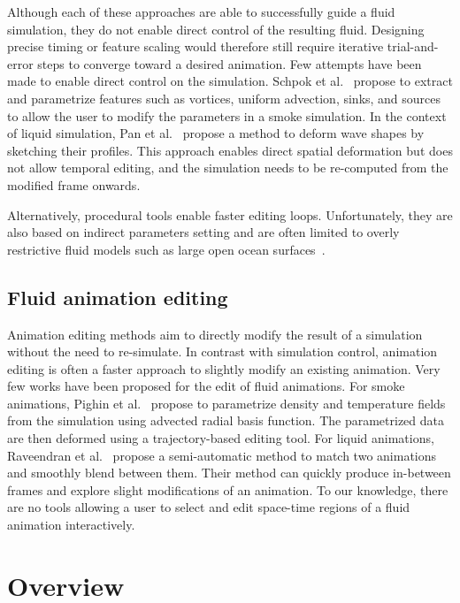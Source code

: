 \documentclass[review]{acmsiggraph}
\begin{document}
Although each of these approaches are able to successfully guide a fluid simulation, they do not enable direct control of the resulting fluid. 
Designing precise timing or feature scaling would therefore still require iterative trial-and-error steps to converge toward a desired animation.
Few attempts have been made to enable direct control on the simulation. 
Schpok et al.~ propose to extract and parametrize features such as vortices, uniform advection, sinks, and sources to allow the user to modify the parameters in a smoke simulation. 
In the context of liquid simulation, Pan et al.~ propose a method to deform wave shapes by sketching their profiles. 
This approach enables direct spatial deformation but does not allow temporal editing, and the simulation needs to be re-computed from the modified frame onwards.

Alternatively, procedural tools enable faster editing loops. 
Unfortunately, they are also based on indirect parameters setting and are often limited to overly restrictive fluid models such as large open ocean surfaces~\cite{hinsinger2002,Tessendorf2004,jeschke2015water,horvath2015empirical}.

\subsection{Fluid animation editing}
Animation editing methods aim to directly modify the result of a simulation without the need to re-simulate. In contrast with simulation control, animation editing is often a faster approach to slightly modify an existing animation. Very few works have been proposed for the edit of fluid animations. For smoke animations, Pighin et al.~ propose to parametrize density and temperature fields from the simulation using advected radial basis function. The parametrized data are then deformed using a trajectory-based editing tool. For liquid animations, Raveendran et al.~ propose a semi-automatic method to match two animations and smoothly blend between them. Their method can quickly produce in-between frames and explore slight modifications of an animation. To our knowledge, there are no tools allowing a user to select and edit space-time regions of a fluid animation interactively.

\section{Overview}\label{sec:overview}
\end{document}
